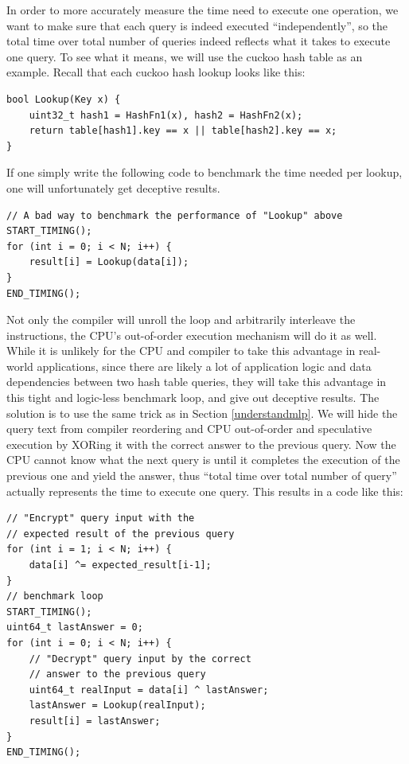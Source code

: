 \documentclass[11pt, usletter]{article}
\begin{document}
In order to more accurately measure the time need to execute one operation, 
we want to make sure that each query is indeed executed ``independently'', 
so the total time over total number of queries indeed reflects what it takes to execute one query. 
To see what it means, we will use the cuckoo hash table as an example. 
Recall that each cuckoo hash lookup looks like this:

\singlespacing\begin{codebox}
\begin{verbatim}
bool Lookup(Key x) {
    uint32_t hash1 = HashFn1(x), hash2 = HashFn2(x);
    return table[hash1].key == x || table[hash2].key == x;
}
\end{verbatim}
\end{codebox}\doublespacing

If one simply write the following code to benchmark the time needed per lookup, 
one will unfortunately get deceptive results.

\singlespacing\begin{codebox}
\begin{verbatim}
// A bad way to benchmark the performance of "Lookup" above
START_TIMING();
for (int i = 0; i < N; i++) { 
    result[i] = Lookup(data[i]);
}
END_TIMING();
\end{verbatim}
\end{codebox}\doublespacing

Not only the compiler will unroll the loop and arbitrarily interleave the instructions, 
the CPU's out-of-order execution mechanism will do it as well. 
While it is unlikely for the CPU and compiler to take this advantage in real-world applications, 
since there are likely a lot of application logic and data dependencies between two hash table queries, 
they will take this advantage in this tight and logic-less benchmark loop, and give out deceptive results. 
The solution is to use the same trick as in Section \ref{understandmlp}. 
We will hide the query text from compiler reordering and CPU out-of-order and speculative execution by 
XORing it with the correct answer to the previous query. 
Now the CPU cannot know what the next query is until it completes the execution of the previous one and yield the answer, 
thus ``total time over total number of query'' actually represents the time to execute one query. 
This results in a code like this:

\singlespacing\begin{codebox}
\begin{verbatim}
// "Encrypt" query input with the 
// expected result of the previous query
for (int i = 1; i < N; i++) {
    data[i] ^= expected_result[i-1];
}
// benchmark loop
START_TIMING();
uint64_t lastAnswer = 0;
for (int i = 0; i < N; i++) { 
    // "Decrypt" query input by the correct 
    // answer to the previous query 
    uint64_t realInput = data[i] ^ lastAnswer;
    lastAnswer = Lookup(realInput);
    result[i] = lastAnswer;
}
END_TIMING();
\end{verbatim}
\end{codebox}\doublespacing
\end{document}
